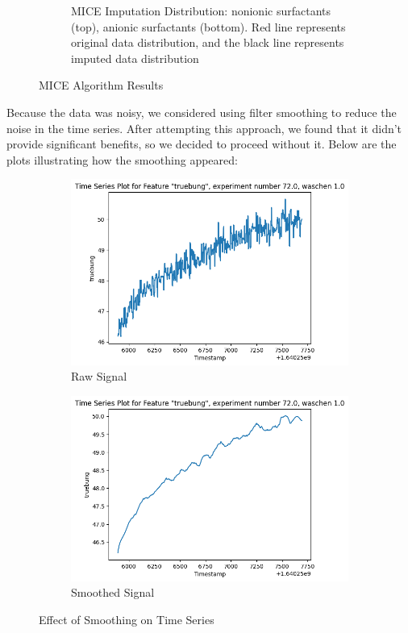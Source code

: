 \documentclass{report}
\begin{document}
\begin{figure}[H]
\begin{subfigure}[t]{0.48\textwidth}
        \caption{MICE Imputation Distribution: nonionic surfactants (top), anionic surfactants (bottom). Red line represents original data distribution, and the black line represents imputed data distribution}
        \label{fig:MICE_distribution}
    \end{subfigure}
    \caption{MICE Algorithm Results}
\end{figure}

Because the data was noisy, we considered using filter smoothing to reduce the noise in the time series. After attempting this approach, we found that it didn't provide significant benefits, so we decided to proceed without it. Below are the plots illustrating how the smoothing appeared:

\begin{figure}[h]
    \begin{subfigure}[t]{0.48\textwidth}
        \centering
        \includegraphics[width=\linewidth]{sensor_noisy_plot.png}
        \caption{Raw Signal}
        \label{fig:smoothing_a}
    \end{subfigure}
    \hfill
    \begin{subfigure}[t]{0.48\textwidth}
        \centering
        \includegraphics[width=\linewidth]{smoothing.png}
        \caption{Smoothed Signal}
        \label{fig:smoothing_b}
    \end{subfigure}
    \caption{Effect of Smoothing on Time Series}
\end{figure}
\end{document}
